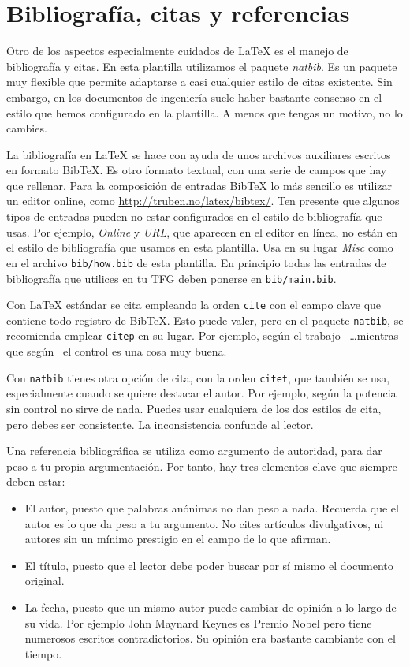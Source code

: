 \section{Bibliografía, citas y referencias} 
\label{sec:bibliografia-citas}

Otro de los aspectos especialmente cuidados de \LaTeX{} es el manejo de bibliografía y citas.  En esta plantilla utilizamos el paquete \emph{natbib}.  Es un paquete muy flexible que permite adaptarse a casi cualquier estilo de citas existente.  Sin embargo, en los documentos de ingeniería suele haber bastante consenso en el estilo que hemos configurado en la plantilla.  A menos que tengas un motivo, no lo cambies.

La bibliografía en \LaTeX{} se hace con ayuda de unos archivos auxiliares escritos en formato BibTeX.  Es otro formato textual, con una serie de campos que hay que rellenar.  Para la composición de entradas BibTeX lo más sencillo es utilizar un editor online, como \url{http://truben.no/latex/bibtex/}.  Ten presente que algunos tipos de entradas pueden no estar configurados en el estilo de bibliografía que usas.  Por ejemplo, \emph{Online} y \emph{URL}, que aparecen en el editor en línea, no están en el estilo de bibliografía que usamos en esta plantilla.  Usa en su lugar \emph{Misc} como en el archivo \texttt{bib/how.bib} de esta plantilla.  En principio todas las entradas de bibliografía que utilices en tu TFG deben ponerse en \texttt{bib/main.bib}.

Con \LaTeX{} estándar se cita empleando la orden \texttt{cite} con el campo clave que contiene todo registro de BibTeX.  Esto puede valer, pero en el paquete \texttt{natbib}, se recomienda emplear \texttt{citep} en su lugar.  Por ejemplo, según el trabajo~\citep{armas2011estimation} \ldots mientras que según~\citep{castillo2010design} el control es una cosa muy buena. 

Con \texttt{natbib} tienes otra opción de cita, con la orden \texttt{citet}, que también se usa, especialmente cuando se quiere destacar el autor.  Por ejemplo, según \citet{castillo2011time} la potencia sin control no sirve de nada.  Puedes usar cualquiera de los dos estilos de cita, pero debes ser consistente.  La inconsistencia confunde al lector.

Una referencia bibliográfica se utiliza como argumento de autoridad, para dar peso a tu propia argumentación.  Por tanto, hay tres elementos clave que siempre deben estar: 
\begin{itemize}
    \item El autor, puesto que palabras anónimas no dan peso a nada.  Recuerda que el autor es lo que da peso a tu argumento.  No cites artículos divulgativos, ni autores sin un mínimo prestigio en el campo de lo que afirman.
    \item El título, puesto que el lector debe poder buscar por sí mismo el documento original.
    \item La fecha, puesto que un mismo autor puede cambiar de opinión a lo largo de su vida.  Por ejemplo  John Maynard Keynes es Premio Nobel pero tiene numerosos escritos contradictorios.  Su opinión era bastante cambiante con el tiempo.
\end{itemize}

